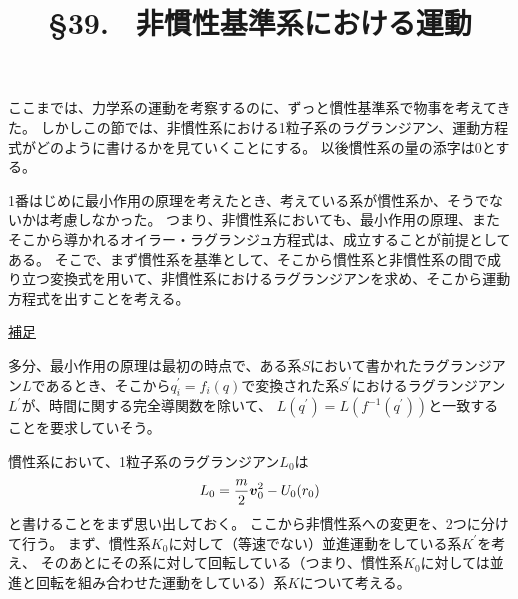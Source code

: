\documentclass[a4paper]{jsarticle}
\title{\S 39. \ 非慣性基準系における運動}
\def\vec#1{\mbox{\boldmath $#1$}}
\begin{document}
\maketitle

ここまでは、力学系の運動を考察するのに、ずっと慣性基準系で物事を考えてきた。
しかしこの節では、非慣性系における1粒子系のラグランジアン、運動方程式がどのように書けるかを見ていくことにする。
以後慣性系の量の添字は0とする。

1番はじめに最小作用の原理を考えたとき、考えている系が慣性系か、そうでないかは考慮しなかった。
つまり、非慣性系においても、最小作用の原理、またそこから導かれるオイラー・ラグランジュ方程式は、成立することが前提としてある。
そこで、まず慣性系を基準として、そこから慣性系と非慣性系の間で成り立つ変換式を用いて、非慣性系におけるラグランジアンを求め、そこから運動方程式を出すことを考える。
\begin{screen}
	\underline{補足}

	多分、最小作用の原理は最初の時点で、ある系$S$において書かれたラグランジアン$L$であるとき、そこから$q_i^{\prime} = f_i(q)$で変換された系$S^{\prime}$におけるラグランジアン$L^{\prime}$が、時間に関する完全導関数を除いて、
	$L(q^{\prime}) = L(f^{-1}(q^{\prime}))$と一致することを要求していそう。
\end{screen}

慣性系において、1粒子系のラグランジアン$L_0$は
\begin{align}
	L_0 = \frac{m}{2} \vec{v}_0^2 - U_0(r_0)
\end{align}
と書けることをまず思い出しておく。
ここから非慣性系への変更を、2つに分けて行う。
まず、慣性系$K_0$に対して（等速でない）並進運動をしている系$K^{\prime}$を考え、
そのあとにその系に対して回転している（つまり、慣性系$K_0$に対しては並進と回転を組み合わせた運動をしている）系$K$について考える。
\end{document}
